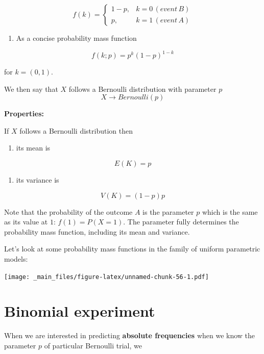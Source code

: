 \documentclass[
]{book}
\providecommand{\tightlist}{%
  \setlength{\itemsep}{0pt}\setlength{\parskip}{0pt}}
\begin{document}
\[
    f(k)= 
\begin{cases}
    1-p,&  k=0\, (event\, B)\\
    p,& k=1\, (event\, A) 
\end{cases}
\]

\begin{enumerate}
\def\labelenumi{\arabic{enumi})}
\setcounter{enumi}{2}
\tightlist
\item
  As a concise probability mass function
\end{enumerate}

\[f(k; p)=p^k(1-p)^{1-k} \]

for \(k=(0,1)\).

We then say that \(X\) follows a Bernoulli distribution with parameter \(p\)
\[X \rightarrow Bernoulli(p)\]

\textbf{Properties:}

If \(X\) follows a Bernoulli distribution then

\begin{enumerate}
\def\labelenumi{\arabic{enumi})}
\tightlist
\item
  its mean is
\end{enumerate}

\[E(K)=p\]

\begin{enumerate}
\def\labelenumi{\arabic{enumi})}
\setcounter{enumi}{1}
\tightlist
\item
  its variance is
\end{enumerate}

\[V(K)=(1-p)p\]

Note that the probability of the outcome \(A\) is the parameter \(p\)
which is the same as its value at \(1\): \(f(1)=P(X=1)\). The parameter fully determines the probability mass function, including its mean and variance.

Let's look at some probability mass functions in the family of uniform parametric models:

\texttt{[image: \_main\_files/figure-latex/unnamed-chunk-56-1.pdf]}

\hypertarget{binomial-experiment}{%
\section{Binomial experiment}\label{binomial-experiment}}

When we are interested in predicting \textbf{absolute frequencies} when we know the parameter \(p\) of particular Bernoulli trial, we
\end{document}
